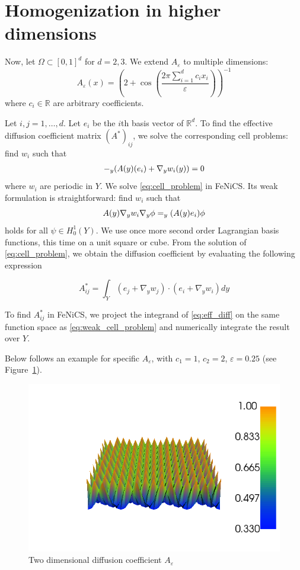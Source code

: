 \documentclass{article}
\renewcommand{\epsilon}{\varepsilon}
\newcommand{\R}{\mathbb{ R}}
\let\div\relax
\DeclareMathOperator{\div}{div}
\begin{document}
\section{Homogenization in higher dimensions}
Now, let $\Omega \subset [0,1]^d$ for $d=2,3$. We extend $A_\epsilon$ to multiple dimensions:
\begin{equation}
    A_\epsilon(x) =  \left( 2+\cos\left(\frac{2\pi \sum_{i=1}^dc_ix_i}{\epsilon}\right) \right)^{-1}
\end{equation}
where $c_i \in \R$ are arbitrary coefficients. 

Let $i,j=1,\dots,d$. Let $e_i$ be the $i$th basis vector of $\R^d$. To find the effective diffusion coefficient matrix $(A^*)_{ij}$, we solve the corresponding cell problems: find $w_i$ such that
\begin{equation}
    \begin{split}
        -\div_y(A(y)(e_i) + \nabla_y w_i(y)) = 0
    \end{split}
    \label{eq:cell_problem}
\end{equation}
where $w_i$ are periodic in $Y$.
We solve \eqref{eq:cell_problem} in FeNiCS. Its weak formulation is straightforward: find $w_i$ such that
\begin{equation}
    A(y)\nabla_y w_i \nabla_y \phi = \div_y(A(y)e_i)\phi
    \label{eq:weak_cell_problem}
\end{equation}
holds for all $\psi \in H^1_0(Y)$. We use once more second order Lagrangian basis functions, this time on a unit square or cube.
From the solution of \eqref{eq:cell_problem}, we obtain the diffusion coefficient by evaluating the following expression

\begin{equation}
    A^*_{ij} = \int_Y(e_j + \nabla_y w_j)\cdot(e_i + \nabla_y w_i)dy
    \label{eq:eff_diff}
\end{equation}

To find $A^*_{ij}$ in FeNiCS, we project the integrand of \eqref{eq:eff_diff} on the same function space as \eqref{eq:weak_cell_problem} and numerically integrate the result over $Y$.

Below follows an example for specific $A_\epsilon$, with $c_1=1$, $c_2=2$, $\epsilon = 0.25$ (see Figure~\ref{fig:two_dim_diff}).

\begin{figure}[h]
    \centering
    \includegraphics[width=0.8\linewidth]{two_dim_diff.png}
    \caption{Two dimensional diffusion coefficient $A_\epsilon$}
    \label{fig:two_dim_diff}
\end{figure}
\end{document}
